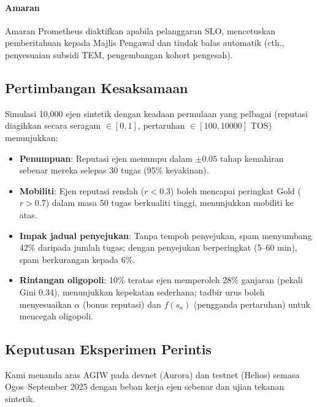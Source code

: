 \documentclass[11pt]{article}
\begin{document}
\paragraph{Amaran} Amaran Prometheus diaktifkan apabila pelanggaran SLO, mencetuskan pemberitahuan kepada Majlis Pengawal dan tindak balas automatik (cth., penyesuaian subsidi TEM, pengembangan kohort pengesah).

\subsection{Pertimbangan Kesaksamaan}
Simulasi 10,000 ejen sintetik dengan keadaan permulaan yang pelbagai (reputasi diagihkan secara seragam $\in [0,1]$, pertaruhan $\in [100, 10000]$ TOS) menunjukkan:
\begin{itemize}[noitemsep]
  \item \textbf{Penumpuan}: Reputasi ejen menumpu dalam $\pm0.05$ tahap kemahiran sebenar mereka selepas 30 tugas (95\% keyakinan).
  \item \textbf{Mobiliti}: Ejen reputasi rendah ($r<0.3$) boleh mencapai peringkat Gold ($r>0.7$) dalam masa 50 tugas berkualiti tinggi, menunjukkan mobiliti ke atas.
  \item \textbf{Impak jadual penyejukan}: Tanpa tempoh penyejukan, spam menyumbang 42\% daripada jumlah tugas; dengan penyejukan berperingkat (5--60 min), spam berkurangan kepada 6\%.
  \item \textbf{Rintangan oligopoli}: 10\% teratas ejen memperoleh 28\% ganjaran (pekali Gini 0.34), menunjukkan kepekatan sederhana; tadbir urus boleh menyesuaikan $\alpha$ (bonus reputasi) dan $f(s_a)$ (pengganda pertaruhan) untuk mencegah oligopoli.
\end{itemize}

\subsection{Keputusan Eksperimen Perintis}
\label{sec:pilot-results}
Kami menanda aras AGIW pada devnet (Aurora) dan testnet (Helios) semasa Ogos--September 2025 dengan beban kerja ejen sebenar dan ujian tekanan sintetik.
\end{document}
